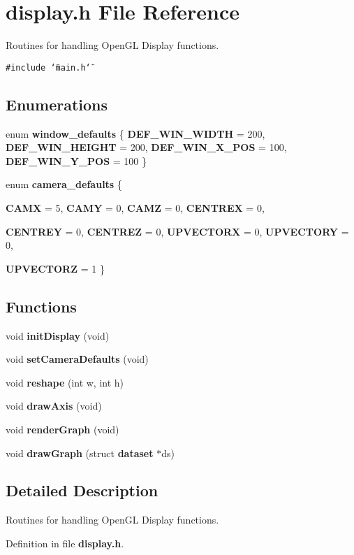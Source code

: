 \section{display.h File Reference}
\label{display_8h}
Routines for handling Open\-GL Display functions.  


{\tt \#include \char`\"{}main.h\char`\"{}}\par
\subsection*{Enumerations}
\begin{CompactItemize}
\item 
enum {\bf window\_\-defaults} \{ {\bf DEF\_\-WIN\_\-WIDTH} =  200, 
{\bf DEF\_\-WIN\_\-HEIGHT} =  200, 
{\bf DEF\_\-WIN\_\-X\_\-POS} =  100, 
{\bf DEF\_\-WIN\_\-Y\_\-POS} =  100
 \}
\item 
enum {\bf camera\_\-defaults} \{ \par
{\bf CAMX} =  5, 
{\bf CAMY} =  0, 
{\bf CAMZ} =  0, 
{\bf CENTREX} =  0, 
\par
{\bf CENTREY} =  0, 
{\bf CENTREZ} =  0, 
{\bf UPVECTORX} =  0, 
{\bf UPVECTORY} =  0, 
\par
{\bf UPVECTORZ} =  1
 \}
\end{CompactItemize}
\subsection*{Functions}
\begin{CompactItemize}
\item 
void {\bf init\-Display} (void)
\item 
void {\bf set\-Camera\-Defaults} (void)
\item 
void {\bf reshape} (int w, int h)
\item 
void {\bf draw\-Axis} (void)
\item 
void {\bf render\-Graph} (void)
\item 
void {\bf draw\-Graph} (struct {\bf dataset} $\ast$ds)
\end{CompactItemize}


\subsection{Detailed Description}
Routines for handling Open\-GL Display functions. 



Definition in file {\bf display.h}.

